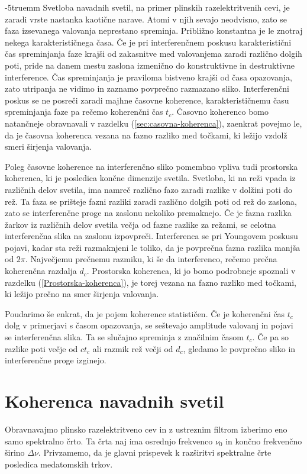 \vglue-5truemm
Svetloba navadnih svetil, na primer plinskih razelektritvenih cevi, 
je zaradi vrste nastanka kaotične narave. 
Atomi v njih sevajo neodvisno, zato se faza izsevanega valovanja neprestano
spreminja. Približno konstantna je le znotraj nekega karakterističnega
časa. Če je pri interferenčnem poskusu karakteristični čas spreminjanja
faze krajši od zakasnitve med valovanjema zaradi različno
dolgih poti, pride na danem mestu zaslona izmenično do konstruktivne in 
destruktivne interference. Čas spreminjanja je praviloma
bistveno krajši od časa opazovanja, zato utripanja ne vidimo in 
zaznamo povprečno razmazano sliko. Interferenčni poskus se ne 
posreči zaradi majhne časovne koherence,
karakterističnemu času spreminjanja faze pa rečemo 
koherenčni čas
$t_{c}$. Časovno koherenco bomo natančneje obravnavali v razdelku
(\ref{sec:casovna-koherenca}), zaenkrat povejmo le, da je časovna
koherenca vezana na fazno razliko med točkami, ki ležijo
vzdolž smeri širjenja valovanja. 

Poleg časovne koherence na interferenčno sliko pomembno vpliva tudi
prostorska koherenca, ki je posledica
končne dimenzije svetila. Svetloba, ki na reži vpada iz različnih delov
svetila, ima namreč različno fazo zaradi razlike v dolžini poti 
do rež. Ta faza se prišteje fazni razliki zaradi različno dolgih poti 
od rež do zaslona, zato se interferenčne proge na zaslonu nekoliko 
premaknejo. Če je fazna razlika žarkov iz različnih
delov svetila večja od fazne razlike za režami, se celotna interferenčna
slika na zaslonu izpovpreči. Interferenca se pri Youngovem poskusu
pojavi, kadar sta reži razmaknjeni le toliko, da je povprečna fazna
razlika manjša od $2\pi$. Največjemu prečnemu razmiku, ki še da interferenco,
rečemo prečna koherenčna razdalja $d_{c}$. 
Prostorska koherenca, ki jo bomo podrobneje spoznali v razdelku 
(\ref{Prostorska-koherenca}),
je torej vezana na fazno razliko med točkami, ki ležijo prečno 
na smer širjenja valovanja.

Poudarimo še enkrat, da je pojem koherence statističen.
Če je koherenčni čas $t_{c}$ dolg v primerjavi s časom opazovanja,
se seštevajo amplitude valovanj in pojavi se interferenčna slika.
Ta se slučajno spreminja z značilnim časom $t_{c}$. Če pa so razlike
poti večje od $ct_{c}$ ali razmik rež večji od $d_{c}$, gledamo
le povprečno sliko in interferenčne proge izginejo.

\section{Koherenca navadnih svetil}
\label{chap:kns}
Obravnavajmo plinsko razelektritveno cev in z
ustreznim filtrom izberimo eno samo spektralno črto. Ta črta naj ima
osrednjo frekvenco $\nu_{0}$ in končno frekvenčno širino $\Delta\nu$.
Privzamemo, da je glavni prispevek k razširitvi spektralne črte posledica
medatomskih trkov.

